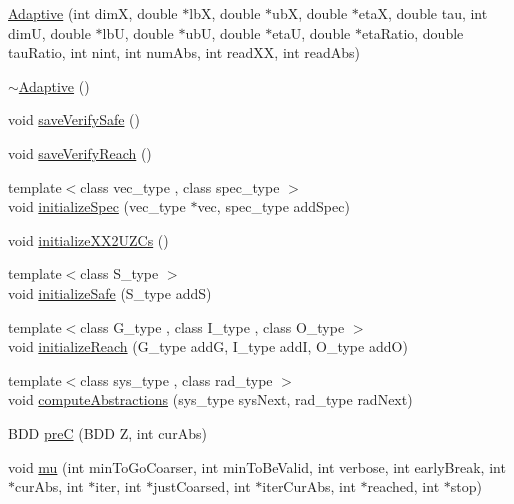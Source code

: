 \begin{DoxyCompactItemize}
\item 
\hyperlink{classscots_1_1Adaptive_a7a6ba80b2a6679ec1194551be3dee698}{Adaptive} (int dimX, double $\ast$lbX, double $\ast$ubX, double $\ast$etaX, double tau, int dimU, double $\ast$lbU, double $\ast$ubU, double $\ast$etaU, double $\ast$eta\+Ratio, double tau\+Ratio, int nint, int num\+Abs, int read\+XX, int read\+Abs)
\item 
\hyperlink{classscots_1_1Adaptive_aa20062d309691c2858912bc3fd9616e7}{$\sim$\+Adaptive} ()
\item 
void \hyperlink{classscots_1_1Adaptive_a629133566055e6445983b86082838b96}{save\+Verify\+Safe} ()
\item 
void \hyperlink{classscots_1_1Adaptive_aed48ef46c84bf6797bea16f896e44e3a}{save\+Verify\+Reach} ()
\item 
{\footnotesize template$<$class vec\+\_\+type , class spec\+\_\+type $>$ }\\void \hyperlink{classscots_1_1Adaptive_aac25a2399ed09b07ef546579c94b0726}{initialize\+Spec} (vec\+\_\+type $\ast$vec, spec\+\_\+type add\+Spec)
\item 
void \hyperlink{classscots_1_1Adaptive_ad7b09416eb224909dcfddcb6487b3b82}{initialize\+X\+X2\+U\+Z\+Cs} ()
\item 
{\footnotesize template$<$class S\+\_\+type $>$ }\\void \hyperlink{classscots_1_1Adaptive_abb37f63b898de0d0013839d3b9d1db2f}{initialize\+Safe} (S\+\_\+type addS)
\item 
{\footnotesize template$<$class G\+\_\+type , class I\+\_\+type , class O\+\_\+type $>$ }\\void \hyperlink{classscots_1_1Adaptive_a63afb68f37f6140095c2460d07fc19cb}{initialize\+Reach} (G\+\_\+type addG, I\+\_\+type addI, O\+\_\+type addO)
\item 
{\footnotesize template$<$class sys\+\_\+type , class rad\+\_\+type $>$ }\\void \hyperlink{classscots_1_1Adaptive_af6aeb2170e7223c1396454ab2b83fb09}{compute\+Abstractions} (sys\+\_\+type sys\+Next, rad\+\_\+type rad\+Next)
\item 
B\+DD \hyperlink{classscots_1_1Adaptive_a4a7b7cbccffbff31c135c9d5bd4d7ec0}{preC} (B\+DD Z, int cur\+Abs)
\item 
void \hyperlink{classscots_1_1Adaptive_a93bf8fd25ea0aa5fad018e596e710ff9}{mu} (int min\+To\+Go\+Coarser, int min\+To\+Be\+Valid, int verbose, int early\+Break, int $\ast$cur\+Abs, int $\ast$iter, int $\ast$just\+Coarsed, int $\ast$iter\+Cur\+Abs, int $\ast$reached, int $\ast$stop)

\end{DoxyCompactItemize}
